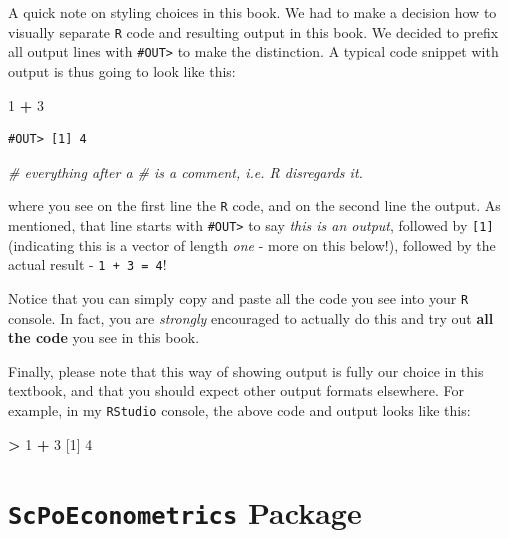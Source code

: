 \documentclass[]{book}
\newenvironment{Shaded}{\begin{snugshade}}{\end{snugshade}}
\newcommand{\CommentTok}[1]{\textcolor[rgb]{0.56,0.35,0.01}{\textit{#1}}}
\newcommand{\DecValTok}[1]{\textcolor[rgb]{0.00,0.00,0.81}{#1}}
\newcommand{\NormalTok}[1]{#1}
\newcommand{\OperatorTok}[1]{\textcolor[rgb]{0.81,0.36,0.00}{\textbf{#1}}}
\newcommand{\StringTok}[1]{\textcolor[rgb]{0.31,0.60,0.02}{#1}}
\begin{document}
A quick note on styling choices in this book. We had to make a decision how to visually separate \texttt{R} code and resulting output in this book. We decided to prefix all output lines with \texttt{\#OUT\textgreater{}} to make the distinction. A typical code snippet with output is thus going to look like this:

\begin{Shaded}
\begin{Highlighting}[]
\DecValTok{1} \OperatorTok{+}\StringTok{ }\DecValTok{3}
\end{Highlighting}
\end{Shaded}

\begin{verbatim}
#OUT> [1] 4
\end{verbatim}

\begin{Shaded}
\begin{Highlighting}[]
\CommentTok{# everything after a # is a comment, i.e. R disregards it.}
\end{Highlighting}
\end{Shaded}

where you see on the first line the \texttt{R} code, and on the second line the output. As mentioned, that line starts with \texttt{\#OUT\textgreater{}} to say \emph{this is an output}, followed by \texttt{{[}1{]}} (indicating this is a vector of length \emph{one} - more on this below!), followed by the actual result - \texttt{1\ +\ 3\ =\ 4}!

Notice that you can simply copy and paste all the code you see into your \texttt{R} console. In fact, you are \emph{strongly} encouraged to actually do this and try out \textbf{all the code} you see in this book.

Finally, please note that this way of showing output is fully our choice in this textbook, and that you should expect other output formats elsewhere. For example, in my \texttt{RStudio} console, the above code and output looks like this:

\begin{Shaded}
\begin{Highlighting}[]
\OperatorTok{>}\StringTok{ }\DecValTok{1} \OperatorTok{+}\StringTok{ }\DecValTok{3}
\NormalTok{[}\DecValTok{1}\NormalTok{] }\DecValTok{4}
\end{Highlighting}
\end{Shaded}

\hypertarget{install-package}{%
\section{\texorpdfstring{\texttt{ScPoEconometrics} Package}{ScPoEconometrics Package}}\label{install-package}}
\end{document}
